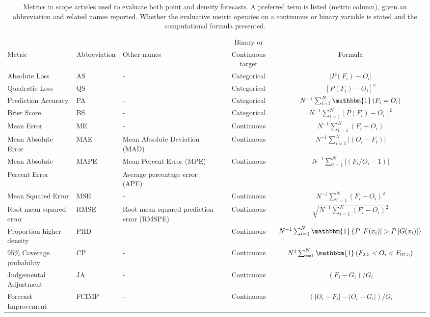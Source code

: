 \documentclass[preprint]{elsarticle}
\def\l{\left}
\def\r{\right}
\begin{document}
\begin{table*}[ht!]
\begin{tabular}{L{4cm}C{3cm}C{4cm}cc}
    \hline
           &              &             & Binary or         &\\
    Metric & Abbreviation & Other names & Continuous target & Formula  \\
    \hline
    Absolute Loss  & AS                    & - & Categorical  &  $|P(F_{i}) - O_{i}|$\\
    Quadratic Loss & QS                    & - & Categorical  &  $\l[P(F_{i}) - O_{i}\r]^{2}$ \\
    Prediction Accuracy  & PA              & - & Categorical  &  $N^{-1} \sum_{i=1}^{N} \mathbbm{1}\l( F_{i} = O_{i} \r)$ \\
    Brier Score & BS                      & - & Categorical  &  $N^{-1} \sum_{i=1}^{N} \l[P(F_{i}) - O_{i}\r]^{2}$\\
    Mean Error & ME                       & - & Continuous   & $N^{-1} \sum_{i=1}^{N} (F_{i} - O_{i})$\\
    Mean Absolute Error & MAE             & Mean Absolute Deviation (MAD) & Continuous & $N^{-1} \sum_{i=1}^{N} |(O_{i} -F_{i} )|$\\
    Mean Absolute & MAPE    & Mean Percent Error (MPE)   & Continuous   & $N^{-1} \sum_{i=1}^{N} |(F_{i}/ O_{i} -1 )|$\\
    Percent Error                                       && Average percentage error (APE)\\
    Mean Squared Error & MSE              & - & Continuous & $N^{-1} \sum_{i=1}^{N} (F_{i} - O_{i})^{2}$ \\
    Root mean squared error & RMSE        & Root mean squared prediction error (RMSPE) & Continuous & $\sqrt{ N^{-1} \sum_{i=1}^{N} (F_{i} - O_{i})^{2}}$\\
    Proportion higher density & PHD       &  & Continuous & $N^{-1} \sum_{i=1}^{N} \mathbbm{1} \l\{ P\l[F(x_{i})\r] > P\l[G(x_{i})\r] \r\}$\\
    95\% Coverage probability & CP      & - & Continuous & $N^{1} \sum_{i=1}^{N} \mathbbm{1}\l( F_{2.5} < O_{i} < F_{97.5} \r)$ \\
    Judgemental Adjustment & JA        & - & Continuous & $\l(F_{i} - G_{i} \r)\Big/ G_{i}$ \\
    Forecast Improvement & FCIMP        & - & Continuous & $\l(|O_{i}-F_{i}| - |O_{i} - G_{i}| \r)\Big/ O_{i}$\\
    \hline
\end{tabular}
\caption{
Metrics in scope articles used to evaluate both point and density forecasts.
A preferred term is listed (metric column), given an abbreviation and related names reported.
Whether the evaluative metric operates on a continuous or binary variable is stated and the computational formula presented. 
\label{tbl.metrics}}
\end{table*}
\end{document}
